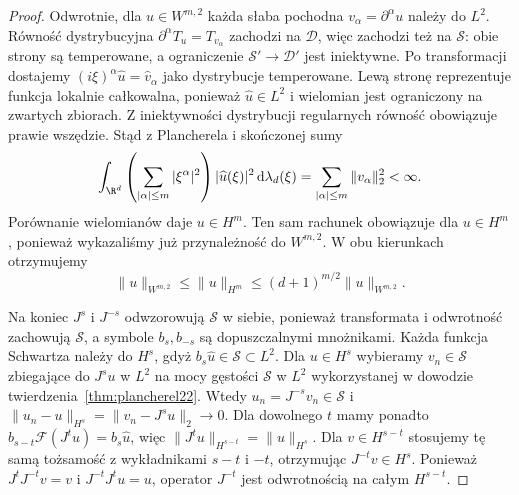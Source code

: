 \begin{proof}
Odwrotnie, dla $u\in W^{m,2}$ każda słaba
pochodna $v_\alpha=\partial^\alpha u$ należy
do $L^2$. Równość dystrybucyjna
$\partial^\alpha T_u=T_{v_\alpha}$ zachodzi
na $\mathcal D$, więc zachodzi też na $\mathcal S$:
obie strony są temperowane, a ograniczenie
$\mathcal S'\to\mathcal D'$ jest iniektywne.
Po transformacji dostajemy
$(i\xi)^\alpha\widehat u=\widehat v_\alpha$
jako dystrybucje temperowane.
Lewą stronę reprezentuje funkcja lokalnie
całkowalna, ponieważ $\widehat u\in L^2$
i wielomian jest ograniczony na zwartych zbiorach.
Z iniektywności dystrybucji regularnych
równość obowiązuje prawie wszędzie.
Stąd z Plancherela i skończonej sumy
\[
 \int_{\R^d}
 \left(\sum_{|\alpha|\le m}|\xi^\alpha|^2\right)
 |\widehat u(\xi)|^2\,\mathrm d\lambda_d(\xi)
 =\sum_{|\alpha|\le m}\|v_\alpha\|_2^2<\infty.
\]
Porównanie wielomianów daje $u\in H^m$.
Ten sam rachunek obowiązuje dla $u\in H^m$,
ponieważ wykazaliśmy już przynależność
do $W^{m,2}$. W obu kierunkach otrzymujemy
\[
 \|u\|_{W^{m,2}}\le\|u\|_{H^m}
 \le(d+1)^{m/2}\|u\|_{W^{m,2}}.
\]

Na koniec $J^s$ i $J^{-s}$ odwzorowują
$\mathcal S$ w siebie, ponieważ transformata
i odwrotność zachowują $\mathcal S$,
a symbole $b_s,b_{-s}$ są dopuszczalnymi
mnożnikami. Każda funkcja Schwartza należy
do $H^s$, gdyż $b_s\widehat u\in\mathcal S\subset L^2$.
Dla $u\in H^s$ wybieramy $v_n\in\mathcal S$
zbiegające do $J^su$ w $L^2$ na mocy
gęstości $\mathcal S$ w $L^2$ wykorzystanej w dowodzie
twierdzenia~\ref{thm:plancherel22}. Wtedy
$u_n=J^{-s}v_n\in\mathcal S$ i
$\|u_n-u\|_{H^s}=\|v_n-J^su\|_2\to0$.
Dla dowolnego $t$ mamy ponadto
$b_{s-t}\mathcal F(J^tu)=b_s\widehat u$,
więc $\|J^tu\|_{H^{s-t}}=\|u\|_{H^s}$.
Dla $v\in H^{s-t}$ stosujemy tę samą tożsamość
z wykładnikami $s-t$ i $-t$, otrzymując
$J^{-t}v\in H^s$.
Ponieważ $J^tJ^{-t}v=v$ i $J^{-t}J^tu=u$,
operator $J^{-t}$ jest odwrotnością na całym
$H^{s-t}$.
\end{proof}

